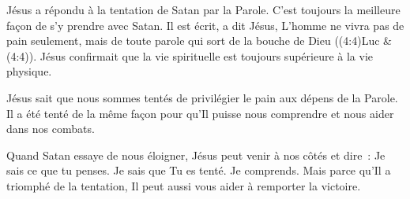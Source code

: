 Jésus a répondu à la tentation de Satan par la Parole.
 C'est toujours la meilleure façon de s'y prendre avec Satan.
 \og Il est écrit, a dit Jésus, L'homme ne vivra pas de pain seulement,
 mais de toute parole qui sort de la bouche de Dieu \fg{}
 ((4:4)Luc \& (4:4)).
 Jésus confirmait que la vie spirituelle est toujours supérieure
 à la vie physique.


Jésus sait que nous sommes tentés de privilégier le pain aux dépens
 de la Parole. Il a été tenté de la même façon pour qu'Il puisse
 nous comprendre et nous aider dans nos combats.

Quand Satan essaye de nous éloigner, Jésus peut venir à nos côtés
 et dire~: 
 \og Je sais ce que tu penses. Je sais que Tu es tenté. Je comprends. \fg{}
 Mais parce qu'Il a triomphé de la tentation, Il peut aussi vous aider
 à remporter la victoire.

\dvrule



